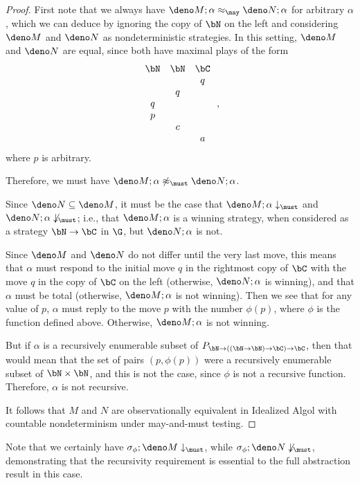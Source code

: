 \begin{proof}
  First note that we always have $\deno M;\alpha\approx_{\may}\deno N;\alpha$ for arbitrary $\alpha$, which we can deduce by ignoring the copy of $\bN$ on the left and considering $\deno M$ and $\deno N$ as nondeterministic strategies.  
  In this setting, $\deno M$ and $\deno N$ are equal, since both have maximal plays of the form
  \[
    \begin{array}{ccc}
      \bN & \bN & \bC \\
          &     &  q  \\
          &  q  &     \\
       q  &     &     \\
       p  &     &     \\
          &  c  &     \\
          &     & a
    \end{array}\,,
    \]
  where $p$ is arbitrary.  

  Therefore, we must have $\deno M;\alpha \not\approx_{\must}\deno N;\alpha$.

  Since $\deno N \subseteq \deno M$, it must be the case that $\deno M;\alpha\downarrow_{\must}$ and $\deno N;\alpha\not\downarrow_{\must}$; i.e., that $\deno M;\alpha$ is a winning strategy, when considered as a strategy $\bN \to \bC$ in $\G$, but $\deno N;\alpha$ is not.

  Since $\deno M$ and $\deno N$ do not differ until the very last move, this means that $\alpha$ must respond to the initial move $q$ in the rightmost copy of $\bC$ with the move $q$ in the copy of $\bC$ on the left (otherwise, $\deno N;\alpha$ is winning), and that $\alpha$ must be total (otherwise, $\deno M;\alpha$ is not winning).
  Then we see that for any value of $p$, $\alpha$ must reply to the move $p$ with the number $\phi(p)$, where $\phi$ is the function defined above.  
  Otherwise, $\deno M;\alpha$ is not winning.

  But if $\alpha$ is a recursively enumerable subset of $P_{\bN \to ((\bN \to \bN) \to \bC) \to \bC}$, then that would mean that the set of pairs $(p,\phi(p))$ were a recursively enumerable subset of $\bN \times \bN$, and this is not the case, since $\phi$ is not a recursive function.  
  Therefore, $\alpha$ is not recursive.  

  It follows that $M$ and $N$ are observationally equivalent in Idealized Algol with countable nondeterminism under may-and-must testing.
\end{proof}

Note that we certainly have $\sigma_\phi;\deno M\downarrow_{\must}$, while $\sigma_\phi;\deno N\not\downarrow_{\must}$, demonstrating that the recursivity requirement is essential to the full abstraction result in this case.

